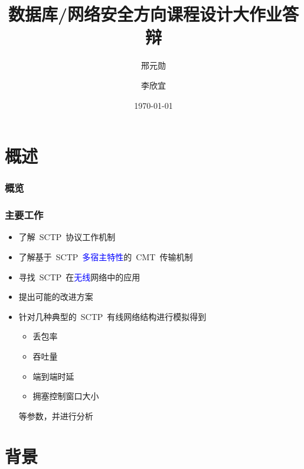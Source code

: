 \documentclass[xcolor={usenames,dvipsnames}]{beamer}
\title[课程设计]{\textbf{数据库/网络安全方向课程设计大作业答辩}} %
\author{邢元勋 \and 李欣宜} %
\institute[DLUT] %
{
大连理工大学软件学院 \\ %
\url{https://github.com/Lixinyi-DUT/sctp_simulation}
}
\date{\today} %
\begin{document}
\begin{frame}
\titlepage %
\end{frame}
\section{概述}
\begin{frame}
\frametitle{\textbf{概览}} %
\tableofcontents %
\end{frame}

\begin{frame}
	\frametitle{\textbf{主要工作}}
	\begin{itemize}
		\item 了解~SCTP~协议工作机制
		\item 了解基于~SCTP~\textcolor{blue}{多宿主特性}的~CMT~传输机制
		\item 寻找~SCTP~在\textcolor{blue}{无线}网络中的应用
		\item 提出可能的改进方案
		\item 针对几种典型的~SCTP~有线网络结构进行模拟得到
		\begin{itemize}
			\item 丢包率
			\item 吞吐量
			\item 端到端时延
			\item 拥塞控制窗口大小
		\end{itemize}
		等参数，并进行分析
	\end{itemize}
\end{frame}
\section{背景} %
\end{document}
